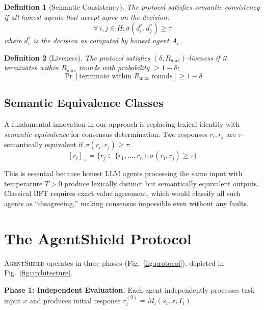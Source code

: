 \documentclass[journal,10pt]{IEEEtran}
\newtheorem{definition}{Definition}
\begin{document}
\begin{definition}[Semantic Consistency]\label{def:sc}
The protocol satisfies semantic consistency if all honest agents that accept agree on the decision:
\begin{equation}\label{eq:sc}
\forall\, i,j \in H: \sigma(d_i^*, d_j^*) \geq \tau
\end{equation}
where $d_i^*$ is the decision as computed by honest agent $A_i$.
\end{definition}

\begin{definition}[Liveness]\label{def:liveness}
The protocol satisfies $(\delta, R_{\max})$-liveness if it terminates within $R_{\max}$ rounds with probability $\geq 1 - \delta$:
\begin{equation}\label{eq:liveness}
\Pr[\text{terminate within } R_{\max} \text{ rounds}] \geq 1 - \delta
\end{equation}
\end{definition}

\subsection{Semantic Equivalence Classes}
A fundamental innovation in our approach is replacing lexical identity with \emph{semantic equivalence} for consensus determination. Two responses $r_i, r_j$ are $\tau$-semantically equivalent if $\sigma(r_i, r_j) \geq \tau$:
\begin{equation}\label{eq:equiv}
[r_i]_\sim = \{r_j \in \{r_1, \ldots, r_n\} : \sigma(r_i, r_j) \geq \tau\}
\end{equation}

This is essential because honest LLM agents processing the same input with temperature $T > 0$ produce lexically distinct but semantically equivalent outputs. Classical BFT requires exact value agreement, which would classify all such agents as ``disagreeing,'' making consensus impossible even without any faults.

\section{The AgentShield Protocol}\label{sec:protocol}

\textsc{AgentShield} operates in three phases (Fig.~\ref{fig:protocol}), depicted in Fig.~\ref{fig:architecture}.

\textbf{Phase 1: Independent Evaluation.} Each agent independently processes task input $x$ and produces initial response $r_i^{(0)} = M_i(s_i, x; T_i)$.
\end{document}
